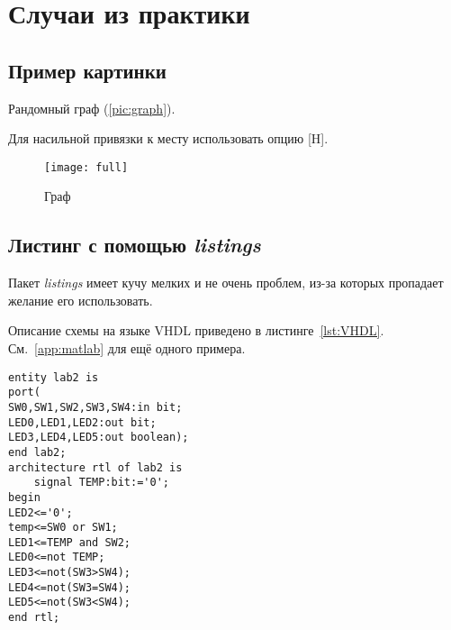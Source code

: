 \section{Случаи из практики}

\subsection{Пример картинки}

Рандомный граф (\vref{pic:graph}). 

Для насильной привязки к месту использовать опцию [H].\cite{float}

\begin{figure}[ht]
	\centering
	\texttt{[image: full]}
	\caption{Граф}
	\label{pic:graph}
\end{figure}

\subsection{Листинг с помощью \emph{listings}}

Пакет \emph{listings} имеет кучу мелких и не очень проблем, из-за которых пропадает желание его использовать.


Описание схемы на языке VHDL приведено в листинге~\ref{lst:VHDL}.
См.~\vref{app:matlab} для ещё одного примера.

\begin{lstlisting}[label=lst:VHDL,caption=Описание схемы]
entity lab2 is
port(
SW0,SW1,SW2,SW3,SW4:in bit;
LED0,LED1,LED2:out bit;
LED3,LED4,LED5:out boolean);
end lab2;
architecture rtl of lab2 is
	signal TEMP:bit:='0';
begin
LED2<='0';
temp<=SW0 or SW1;
LED1<=TEMP and SW2;
LED0<=not TEMP;
LED3<=not(SW3>SW4);
LED4<=not(SW3=SW4);
LED5<=not(SW3<SW4);
end rtl;
\end{lstlisting}

